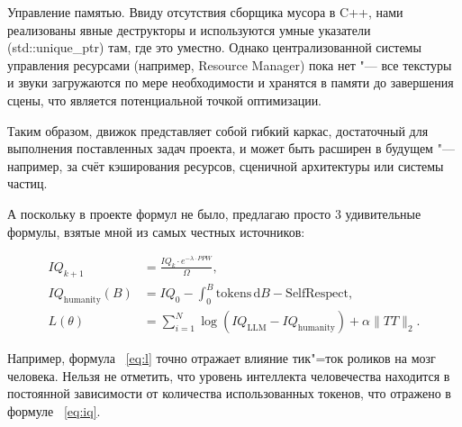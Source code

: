 Управление памятью. Ввиду отсутствия сборщика мусора в C++, нами реализованы явные деструкторы и используются умные указатели (std::unique\_ptr) там, где это уместно. Однако централизованной системы управления ресурсами (например, Resource Manager) пока нет "--- все текстуры и звуки загружаются по мере необходимости и хранятся в памяти до завершения сцены, что является потенциальной точкой оптимизации.

Таким образом, движок представляет собой гибкий каркас, достаточный для выполнения поставленных задач проекта, и может быть расширен в будущем "--- например, за счёт кэширования ресурсов, сценичной архитектуры или системы частиц.

А поскольку в проекте формул не было, предлагаю просто 3 удивительные формулы, взятые мной из самых честных источников:

\begin{align}
IQ_{k+1} &=
\frac{IQ_k \cdot e^{-\lambda \cdot PPW}}{\Omega},\\[1em]
IQ_{\text{humanity}}(B) &=
IQ_0 - \int_{0}^{B} \text{tokens} \, \mathrm{d}B
- \text{SelfRespect},\label{eq:iq} \\[1em]
L(\theta) &=
\sum_{i=1}^{N}
\log\left(IQ_{\text{LLM}} - IQ_{\text{humanity}}\right)
+ \alpha \lVert TT \rVert_2 .\label{eq:l}
\end{align}

Например, формула ~\ref{eq:l} точно отражает влияние тик"=ток роликов на мозг человека. Нельзя не отметить, что уровень интеллекта человечества находится в постоянной зависимости от количества использованных токенов, что отражено в формуле ~\ref{eq:iq}.